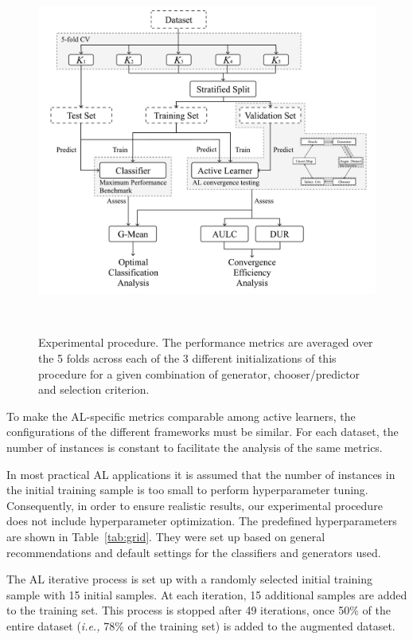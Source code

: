 \documentclass[preprint,12pt]{elsarticle}
\begin{document}
\begin{figure}[H]
	\centering
	\includegraphics[width=\linewidth]{../analysis/experiment_pipeline}
    \caption{Experimental procedure. The performance metrics are averaged over
    the 5 folds across each of the 3 different initializations of this
    procedure for a given combination of generator, chooser/predictor and
    selection criterion.}~\label{fig:experiment_pipeline}
\end{figure}

To make the AL-specific metrics comparable among active learners, the
configurations of the different frameworks must be similar. For each dataset,
the number of instances is constant to facilitate the analysis of the same
metrics. 

In most practical AL applications it is assumed that the number of instances 
in the initial training sample is too small to perform hyperparameter tuning.
Consequently, in order to ensure realistic results, our experimental procedure
does not include hyperparameter optimization. The predefined hyperparameters
are shown in Table~\ref{tab:grid}. They were set up based on general
recommendations and default settings for the classifiers and generators used.

The AL iterative process is set up with a randomly selected initial training
sample with 15 initial samples. At each iteration, 15 additional samples are
added to the training set. This process is stopped after 49 iterations, once
50\% of the entire dataset (\textit{i.e.,} 78\% of the training set) is added
to the augmented dataset.
\end{document}

